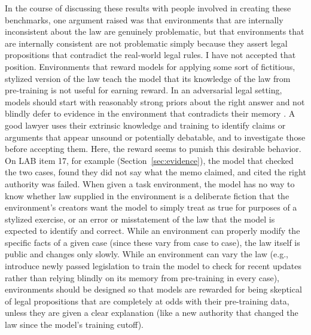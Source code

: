 \documentclass[11pt]{article}
\begin{document}
In the course of discussing these results with people involved in creating these benchmarks, one argument raised was that environments that are internally inconsistent about the law are genuinely problematic, but that environments that are internally consistent are not problematic simply because they assert legal propositions that contradict the real-world legal rules. I have not accepted that position. Environments that reward models for applying some sort of fictitious, stylized version of the law teach the model that its knowledge of the law from pre-training is not useful for earning reward. In an adversarial legal setting, models should start with reasonably strong priors about the right answer and not blindly defer to evidence in the environment that contradicts their memory \citep{knowledgeConflicts}. A good lawyer uses their extrinsic knowledge and training to identify claims or arguments that appear unsound or potentially debatable, and to investigate those before accepting them. Here, the reward seems to punish this desirable behavior. On LAB item 17, for example (Section~\ref{sec:evidence}), the model that checked the two cases, found they did not say what the memo claimed, and cited the right authority was failed. When given a task environment, the model has no way to know whether law supplied in the environment is a deliberate fiction that the environment's creators want the model to simply treat as true for purposes of a stylized exercise, or an error or misstatement of the law that the model is expected to identify and correct. While an environment can properly modify the specific facts of a given case (since these vary from case to case), the law itself is public and changes only slowly. While an environment can vary the law (e.g., introduce newly passed legislation to train the model to check for recent updates rather than relying blindly on its memory from pre-training in every case), environments should be designed so that models are rewarded for being skeptical of legal propositions that are completely at odds with their pre-training data, unless they are given a clear explanation (like a new authority that changed the law since the model's training cutoff).
\end{document}
